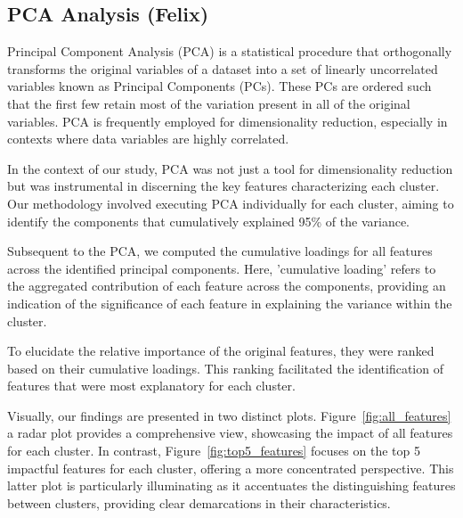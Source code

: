 \documentclass[12pt]{article}
\begin{document}

\subsection{PCA Analysis (Felix)}

Principal Component Analysis (PCA) is a statistical procedure that orthogonally transforms the original variables of a dataset into a set of linearly uncorrelated variables known as Principal Components (PCs). These PCs are ordered such that the first few retain most of the variation present in all of the original variables. PCA is frequently employed for dimensionality reduction, especially in contexts where data variables are highly correlated.

In the context of our study, PCA was not just a tool for dimensionality reduction but was instrumental in discerning the key features characterizing each cluster. Our methodology involved executing PCA individually for each cluster, aiming to identify the components that cumulatively explained 95\% of the variance.

Subsequent to the PCA, we computed the cumulative loadings for all features across the identified principal components. Here, 'cumulative loading' refers to the aggregated contribution of each feature across the components, providing an indication of the significance of each feature in explaining the variance within the cluster.

To elucidate the relative importance of the original features, they were ranked based on their cumulative loadings. This ranking facilitated the identification of features that were most explanatory for each cluster.

Visually, our findings are presented in two distinct plots. 
Figure~\ref{fig:all_features} a radar plot provides a comprehensive view, showcasing the impact of all features for each cluster. 
In contrast, Figure~\ref{fig:top5_features} focuses on the top 5 impactful features for each cluster, offering a more concentrated perspective. This latter plot is particularly illuminating as it accentuates the distinguishing features between clusters, providing clear demarcations in their characteristics.
\end{document}
